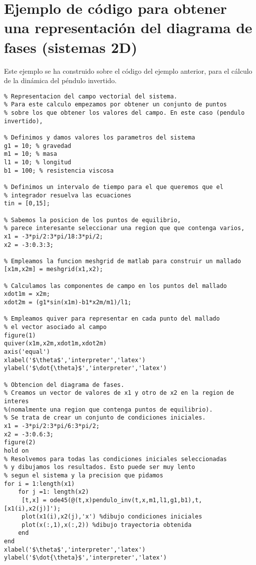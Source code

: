 \section[diagramas de fase para sistemas 2D]{Ejemplo de código para obtener una representación del diagrama de fases (sistemas 2D)}\label{AVdP}

Este ejemplo se ha construido sobre el código del ejemplo anterior, para el cálculo de la dinámica del péndulo invertido.

\begin{lstlisting}
% Representacion del campo vectorial del sistema. 
% Para este calculo empezamos por obtener un conjunto de puntos
% sobre los que obtener los valores del campo. En este caso (pendulo invertido), 

% Definimos y damos valores los parametros del sistema
g1 = 10; % gravedad
m1 = 10; % masa
l1 = 10; % longitud
b1 = 100; % resistencia viscosa

% Definimos un intervalo de tiempo para el que queremos que el
% integrador resuelva las ecuaciones
tin = [0,15];

% Sabemos la posicion de los puntos de equilibrio, 
% parece interesante seleccionar una region que que contenga varios,
x1 = -3*pi/2:3*pi/18:3*pi/2;
x2 = -3:0.3:3;

% Empleamos la funcion meshgrid de matlab para construir un mallado
[x1m,x2m] = meshgrid(x1,x2);

% Calculamos las componentes de campo en los puntos del mallado
xdot1m = x2m; 
xdot2m = (g1*sin(x1m)-b1*x2m/m1)/l1;

% Empleamos quiver para representar en cada punto del mallado
% el vector asociado al campo 
figure(1)
quiver(x1m,x2m,xdot1m,xdot2m)
axis('equal')
xlabel('$\theta$','interpreter','latex')
ylabel('$\dot{\theta}$','interpreter','latex')

% Obtencion del diagrama de fases.
% Creamos un vector de valores de x1 y otro de x2 en la region de interes
%(nomalmente una region que contenga puntos de equilibrio).
% Se trata de crear un conjunto de condiciones iniciales.
x1 = -3*pi/2:3*pi/6:3*pi/2;
x2 = -3:0.6:3;
figure(2)
hold on
% Resolvemos para todas las condiciones iniciales seleccionadas
% y dibujamos los resultados. Esto puede ser muy lento
% segun el sistema y la precision que pidamos
for i = 1:length(x1)
    for j =1: length(x2)
     [t,x] = ode45(@(t,x)pendulo_inv(t,x,m1,l1,g1,b1),t,[x1(i),x2(j)]');
     plot(x1(i),x2(j),'x') %dibujo condiciones iniciales
     plot(x(:,1),x(:,2)) %dibujo trayectoria obtenida 
    end
end
xlabel('$\theta$','interpreter','latex')
ylabel('$\dot{\theta}$','interpreter','latex')

\end{lstlisting}

